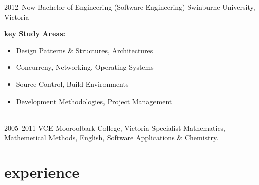 \documentclass[]{friggeri-cv} %
\begin{document}
\begin{entrylist}
\entry
{2012--Now}
{Bachelor {\normalfont of Engineering (Software Engineering)}}
{Swinburne University, Victoria}
{
\textbf{key Study Areas:}
\begin{itemize}
    \item Design Patterns \& Structures, Architectures
    \item Concurreny, Networking, Operating Systems
    \item Source Control, Build Environments
    \item Development Methodologies, Project Management
\end{itemize}
}
\\ %
\entry
{2005--2011}
{VCE {\normalfont}}
{Mooroolbark College, Victoria}
{Specialist Mathematics, Mathemetical Methods, English, Software Applications \& Chemistry.}
\end{entrylist}

\section{experience}
\end{document}
